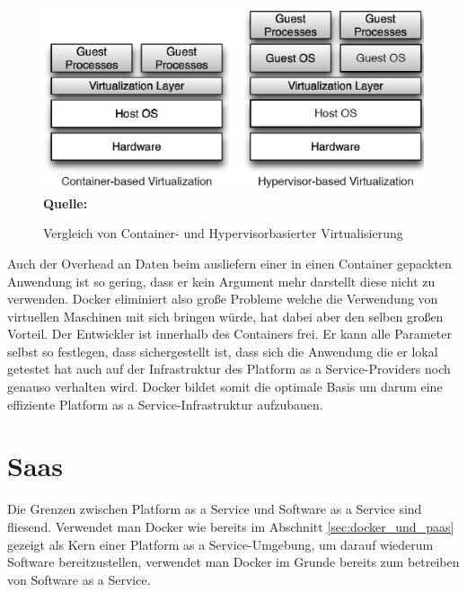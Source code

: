 \begin{figure}[htbp]
  \centering  
  \includegraphics[scale=0.5]{img/abstractionContainerHyper.JPG}\\
  \footnotesize\sffamily\textbf{Quelle:} \cite{miguel_g._xavier_performance_2014}
  \caption{Vergleich von Container- und Hypervisorbasierter Virtualisierung }
  \label{fig:abstraction_container_hyper}
\end{figure}
Auch der Overhead an Daten beim ausliefern einer in einen Container gepackten Anwendung ist so gering, dass er kein Argument mehr darstellt diese nicht zu verwenden.
Docker eliminiert also große Probleme welche die Verwendung von virtuellen Maschinen mit sich bringen würde, hat dabei aber den selben großen Vorteil.
Der Entwickler ist innerhalb des Containers frei. Er kann alle Parameter selbst so festlegen, dass sichergestellt ist, dass sich die Anwendung die er lokal getestet hat auch auf der Infrastruktur des Platform as a Service-Providers noch genauso verhalten wird. 
Docker bildet somit die optimale Basis um darum eine effiziente Platform as a Service-Infrastruktur aufzubauen. 

\section{Saas}
\label{sec:saas}
Die Grenzen zwischen Platform as a Service und Software as a Service sind fliesend.
Verwendet man Docker wie bereits im Abschnitt \ref{sec:docker_und_paas} gezeigt als Kern einer Platform as a Service-Umgebung, um darauf wiederum Software bereitzustellen, verwendet man Docker im Grunde bereits zum betreiben von Software as a Service.

